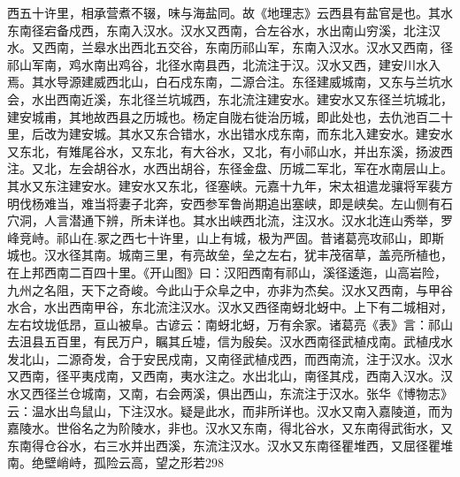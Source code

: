 \documentclass[12pt,UTF8]{ctexbook}
\begin{document}
西五十许里，相承营煮不辍，味与海盐同。故《地理志》云西县有盐官是也。其水东南径宕备戍西，东南入汉水。汉水又西南，合左谷水，水出南山穷溪，北注汉水。又西南，兰皋水出西北五交谷，东南历祁山军，东南入汉水。汉水又西南，径祁山军南，鸡水南出鸡谷，北径水南县西，北流注于汉。汉水又西，建安川水入焉。其水导源建威西北山，白石戍东南，二源合注。东径建威城南，又东与兰坑水会，水出西南近溪，东北径兰坑城西，东北流注建安水。建安水又东径兰坑城北，建安城甫，其地故西县之历城也。杨定自陇右徙治历城，即此处也，去仇池百二十里，后改为建安城。其水又东合错水，水出错水戍东南，而东北入建安水。建安水又东北，有雉尾谷水，又东北，有大谷水，又北，有小祁山水，并出东溪，扬波西注。又北，左会胡谷水，水西出胡谷，东径金盘、历城二军北，军在水南层山上。其水又东注建安水。建安水又东北，径塞峡。元嘉十九年，宋太祖遣龙骧将军裴方明伐杨难当，难当将妻子北奔，安西参军鲁尚期追出塞峡，即是峡矣。左山侧有石穴洞，人言潜通下辨，所未详也。其水出峡西北流，注汉水。汉水北连山秀举，罗峰竞峙。祁山在.冢之西七十许里，山上有城，极为严固。昔诸葛亮攻祁山，即斯城也。汉水径其南。城南三里，有亮故垒，垒之左右，犹丰茂宿草，盖亮所植也，在上邦西南二百四十里。《开山图》曰：汉阳西南有祁山，溪径逶迤，山高岩险，九州之名阻，天下之奇峻。今此山于众阜之中，亦非为杰矣。汉水又西南，与甲谷水合，水出西南甲谷，东北流注汉水。汉水又西径南蚜北蚜中。上下有二城相对，左右坟垅低昂，亘山被阜。古谚云：南蚜北蚜，万有余家。诸葛亮《表》言：祁山去沮县五百里，有民万户，瞩其丘墟，信为殷矣。汉水西南径武植戍南。武植戌水发北山，二源奇发，合于安民戍南，又南径武植戍西，而西南流，注于汉水。汉水又西南，径平夷戍南，又西南，夷水注之。水出北山，南径其戍，西南入汉水。汉水又西径兰仓城南，又南，右会两溪，俱出西山，东流注于汉水。张华《博物志》云：温水出鸟鼠山，下注汉水。疑是此水，而非所详也。汉水又南入嘉陵道，而为嘉陵水。世俗名之为阶陵水，非也。汉水又东南，得北谷水，又东南得武街水，又东南得仓谷水，右三水并出西溪，东流注汉水。汉水又东南径瞿堆西，又屈径瞿堆南。绝壁峭峙，孤险云高，望之形若298 
\end{document}

